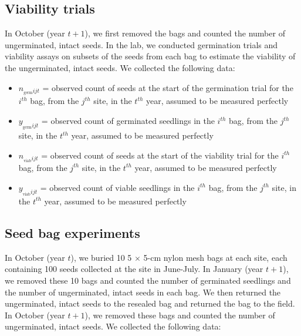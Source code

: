 \documentclass[12pt, oneside, titlepage]{article}   	%
\begin{document}
\subsection*{Viability trials}

In October (year $t+1$), we first removed the bags and counted the number of ungerminated, intact seeds. In the lab, we conducted germination trials and viability assays on subsets of the seeds from each bag to estimate the viability of the ungerminated, intact seeds. We collected the following data: 

\begin{itemize}
	\item $n_{_{\mathrm{germ}} ijt}$ = observed count of seeds at the start of the germination trial for the $i^{th}$ bag, from the $j^{th}$ site, in the $t^{th}$ year, assumed to be measured perfectly
	\item $y_{_{\mathrm{germ}} ijt}$ = observed count of germinated seedlings in the $i^{th}$ bag, from the $j^{th}$ site, in the $t^{th}$ year, assumed to be measured perfectly 
	\item $n_{_{\mathrm{viab}} ijt}$ = observed count of seeds at the start of the viability trial for the $i^{th}$ bag, from the $j^{th}$ site, in the $t^{th}$ year, assumed to be measured perfectly 
	\item $y_{_{\mathrm{viab}} ijt}$ = observed count of viable seedlings in the $i^{th}$ bag, from the $j^{th}$ site, in the $t^{th}$ year, assumed to be measured perfectly 
\end{itemize}

\subsection*{Seed bag experiments}
In October (year $t$), we buried 10 5 $\times$ 5-cm nylon mesh bags at each site, each containing 100 seeds collected at the site in June-July. In January (year $t+1$), we removed these 10 bags and counted the number of germinated seedlings and the number of ungerminated, intact seeds in each bag. We then returned the ungerminated, intact seeds to the resealed bag and returned the bag to the field. In October (year $t+1$), we removed these bags and counted the number of ungerminated, intact seeds. We collected the following data:
\end{document}
